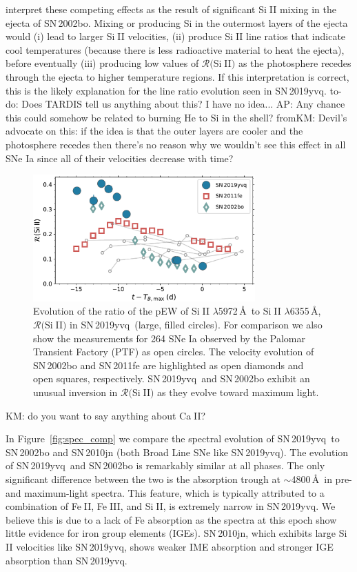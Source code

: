 \documentclass[twocolumn]{aastex63}
\def\ion#1#2{#1$\;${\footnotesize\rm{#2}}\relax}
\newcommand{\kate}[1]{{\color{red} KM: {#1}}}
\newcommand{\fromkate}[1]{{\color{brown} fromKM: {#1}}}
\newcommand{\abi}[1]{{\color{LincolnGreen} AP: {#1}}}
\newcommand{\todo}[1]{{\color{magenta} to-do: {#1}}}
\newcommand{\sn}{SN\,2019yvq}
\begin{document}
\citet{Benetti04} interpret these competing effects as the result of
significant \ion{Si}{II} mixing in the ejecta of SN\,2002bo. Mixing or
producing Si in the outermost layers of the ejecta would (i) lead to larger
\ion{Si}{II} velocities, (ii) produce \ion{Si}{II} line ratios that indicate
cool temperatures (because there is less radioactive material to heat the
ejecta), before eventually (iii) producing low values of
$\mathcal{R}($\ion{Si}{II}$)$ as the photosphere recedes through the ejecta to
higher temperature regions. If this interpretation is correct, this is the
likely explanation for the line ratio evolution seen in \sn. \todo{Does TARDIS
tell us anything about this? I have no idea...} \abi{Any chance this could
somehow be related to burning He to Si in the shell?} \fromkate{Devil's
advocate on this: if the idea is that the outer layers are cooler and the
photosphere recedes then there's no reason why we wouldn't see this effect in
all SNe Ia since all of their velocities decrease with time? }

\begin{figure}
    \centering
    \includegraphics[width=3.35in]{./figures/R_evolution.pdf}
    \caption{Evolution of the ratio of the pEW of \ion{Si}{II}
    $\lambda$5972\,\AA\ to \ion{Si}{II} $\lambda$6355\,\AA,
    $\mathcal{R}($\ion{Si}{II}$)$ in \sn\ (large, filled circles). For
    comparison we also show the measurements for 264 SNe Ia observed by the
    Palomar Transient Factory (PTF) as open circles. The velocity evolution
    of SN\,2002bo and SN\,2011fe are highlighted as open diamonds and open
    squares, respectively. \sn\ and SN\,2002bo exhibit an unusual inversion
    in $\mathcal{R}($\ion{Si}{II}$)$ as they evolve toward maximum light.}
    \label{fig:r_evo}
\end{figure}


\kate{do you want to say anything about \ion{Ca}{II}?}


In Figure~\ref{fig:spec_comp} we compare the spectral evolution of \sn\ to
SN\,2002bo and SN\,2010jn (both \citet{Branch06} Broad Line SNe like \sn).
The evolution of \sn\ and SN\,2002bo is remarkably similar at all phases. The
only significant difference between the two is the absorption trough at
$\sim$4800\,\AA\ in pre- and maximum-light spectra. This feature, which is
typically attributed to a combination of \ion{Fe}{II}, \ion{Fe}{III}, and
\ion{Si}{II}, is extremely narrow in \sn. We believe this is due to a lack of
Fe absorption as the spectra at this epoch show little evidence for iron group
elements (IGEs). SN\,2010jn, which exhibits large \ion{Si}{II} velocities
like \sn, shows weaker IME absorption and stronger IGE absorption than \sn.
\end{document}
